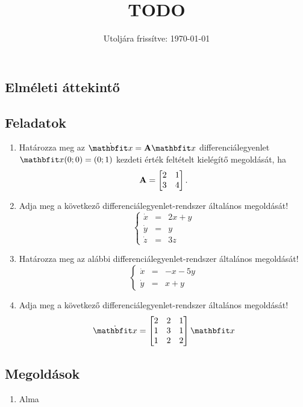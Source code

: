 \documentclass{szb-practice}
\title{TODO}
\date{Utoljára frissítve: \today}
\begin{document}
\maketitle

\subsection{Elméleti áttekintő}

\clearpage
\subsection{Feladatok}

\begin{enumerate}
  \item Határozza meg az $\dot{\rvec x} = \rmat A \rvec x$ differenciálegyenlet
        $\rvec x(0; 0) = (0; 1)$ kezdeti érték feltételt kielégítő megoldását,
        ha
        $$
          \mathbf{A} = \begin{bmatrix}
            2 & 1 \\
            3 & 4
          \end{bmatrix}
          \text.
        $$

  \item Adja meg a következő differenciálegyenlet-rendszer általános megoldását!
        $$
          \left\{
          \begin{array}{rcl}
            \dot x & = & 2x + y \\
            \dot y & = & y      \\
            \dot z & = & 3z
          \end{array}
          \right.
        $$

  \item Határozza meg az alábbi differenciálegyenlet-rendszer általános
        megoldását!
        $$
          \left\{
          \begin{array}{rcl}
            \dot x & = & -x - 5y \\
            \dot y & = & x + y
          \end{array}
          \right.
        $$

  \item Adja meg a következő differenciálegyenlet-rendszer általános megoldását!
        $$
          \dot{\rvec x} = \begin{bmatrix}
            2 & 2 & 1 \\
            1 & 3 & 1 \\
            1 & 2 & 2 \\
          \end{bmatrix} \rvec x
        $$
\end{enumerate}

\clearpage
\subsection{Megoldások}
\begin{enumerate}
  \item Alma
\end{enumerate}
\end{document}
